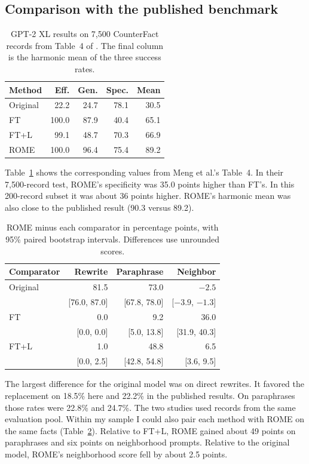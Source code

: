 \documentclass[11pt]{article}
\begin{document}
\subsection{Comparison with the published benchmark}
\begin{table}[t]\centering\small\begin{tabular}{lrrrr}\toprule
Method & Eff. & Gen. & Spec. & Mean\\\midrule
Original & 22.2 & 24.7 & 78.1 & 30.5 \\
FT & 100.0 & 87.9 & 40.4 & 65.1 \\
FT+L & 99.1 & 48.7 & 70.3 & 66.9 \\
ROME & 100.0 & 96.4 & 75.4 & 89.2 \\
\bottomrule\end{tabular}\caption{GPT-2 XL results on 7,500 CounterFact records from Table~4 of \citet{meng2022locating}. The final column is the harmonic mean of the three success rates.}\label{tab:published}
\end{table}
Table~\ref{tab:published} shows the corresponding values from Meng et al.'s Table~4. In their 7,500-record test, ROME's specificity was 35.0 points higher than FT's. In this 200-record subset it was about 36 points higher. ROME's harmonic mean was also close to the published result (90.3 versus 89.2).

\begin{table}[!ht]\centering\small
\setlength{\tabcolsep}{2.7pt}
\begin{tabular}{@{}lrrr@{}}\toprule
Comparator & Rewrite & Paraphrase & Neighbor\\\midrule
Original & 81.5 & 73.0 & $-2.5$\\
         & [76.0, 87.0] & [67.8, 78.0] & [$-3.9$, $-1.3$]\\
FT       & 0.0 & 9.2 & 36.0\\
         & [0.0, 0.0] & [5.0, 13.8] & [31.9, 40.3]\\
FT+L     & 1.0 & 48.8 & 6.5\\
         & [0.0, 2.5] & [42.8, 54.8] & [3.6, 9.5]\\\bottomrule
\end{tabular}
\caption{ROME minus each comparator in percentage points, with 95\% paired bootstrap intervals. Differences use unrounded scores.}\label{tab:paired}
\end{table}

The largest difference for the original model was on direct rewrites. It favored the replacement on 18.5\% here and 22.2\% in the published results. On paraphrases those rates were 22.8\% and 24.7\%. The two studies used records from the same evaluation pool. Within my sample I could also pair each method with ROME on the same facts (Table~\ref{tab:paired}). Relative to FT+L, ROME gained about 49 points on paraphrases and six points on neighborhood prompts. Relative to the original model, ROME's neighborhood score fell by about 2.5 points.
\end{document}
